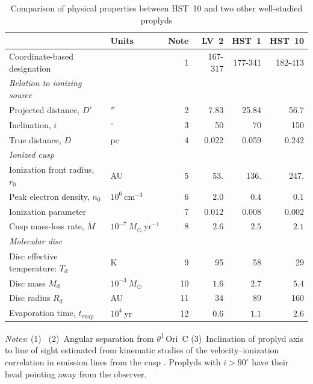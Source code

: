 \documentclass[useAMS,usenatbib]{mn2e}
\newcommand\texttheta{\ensuremath{\theta}}
\newcommand\thC{\texttheta\textsuperscript{1}\,Ori~C}
\begin{document}
\begin{table}\centering
  \caption{Comparison of physical properties between HST~10 and two other well-studied proplyds}
\label{tab:3props}
\setlength\tabcolsep{2\tabcolsep}
\begin{tabular}{llr rrr}\hline
 & Units & Note & LV~2 & HST~1 & HST~10 \\ \hline
Coordinate-based designation & & 1 & 167-317 & 177-341 & 182-413 \\
\rule{0pt}{3ex}\textit{Relation to ionizing source}\\
Projected distance, \(D'\) & \(''\) & 2 & 7.83 & 25.84 & 56.7 \\
Inclination, \(i\) & \(^\circ\) & 3 & 50 & 70 & 150 \\
True distance, \(D\) & pc & 4 & 0.022 & 0.059 & 0.242 \\
\rule{0pt}{3ex}\textit{Ionized cusp} \\
Ionization front radius, \(r_0\) & AU & 5 & 53. & 136. & 247. \\
Peak electron density, \(n_0\) & \(10^{6}\ \mathrm{cm^{-3}}\) & 6 & \(2.0\) & \(0.4\) & \(0.1\) \\
Ionization parameter &  & 7 & 0.012 & 0.008 & 0.002 \\
Cusp mass-loss rate, \(\dot{M}\) & \(10^{-7}\ M_\odot\ \mathrm{yr}^{-1}\) & 8 & \(2.6\) & \(2.5\) & \(2.1\) \\
\rule{0pt}{3ex}\textit{Molecular disc} \\
Disc effective temperature: \(T_\mathrm{d}\) & K & 9 & 95 & 58 & 29 \\
Disc mass \(M_\mathrm{d}\) & \(10^{-3}\ M_\odot\) & 10 & \(1.6\) & \(2.7\) & \(5.4\) \\
Disc radius \(R_\mathrm{d}\) & AU & 11 & 34 & 89 & 160 \\
Evaporation time, \(t_\mathrm{evap}\) & \(10^4\ \mathrm{yr}\) & 12 & \(0.6\) & \(1.1\) & \(2.6\) \\
\hline
\end{tabular}
\par\smallskip
\begin{minipage}{0.7\linewidth}
  \def\NoteSep{\quad}
  \textit{Notes}:\NoteSep 
  (1)~\citet{1994ApJ...436..194O}\NoteSep
  (2)~Angular separation from \thC{} \citep{1998AJ....115..263O}\NoteSep
  (3)~Inclination of proplyd axis to line of sight estimated from kinematic studies of the velocity--ionization correlation in emission lines from the cusp \citep{1999AJ....118.2350H, 2002ApJ...566..315H}.  Proplyds with \(i > 90^\circ\) have their head pointing away from the observer.\NoteSep

\end{minipage}
\end{table}
\end{document}

